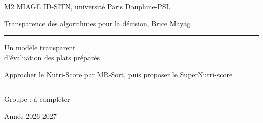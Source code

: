 \documentclass[11pt]{article}
\begin{document}
\begin{titlepage}
  \raggedright
  {\small M2 MIAGE ID-SITN, université Paris Dauphine-PSL\par}
  {\small Transparence des algorithmes pour la décision, Brice Mayag\par}
  \vspace*{5cm}
  \rule{\linewidth}{8pt}\par\vspace{10pt}
  {\policeTitre\fontsize{40}{44}\selectfont Un modèle transparent\\ d'évaluation des plats préparés\par}
  \vspace{12pt}
  {\policeDemiGras\fontsize{16}{20}\selectfont Approcher le Nutri-Score par MR-Sort, puis proposer le SuperNutri-score\par}
  \vspace{6pt}
  \rule{\linewidth}{1pt}\par
  \vfill
  {\small Groupe : à compléter\par}
  {\small Année 2026-2027\par}
\end{titlepage}



\tableofcontents
\newpage







\end{document}
